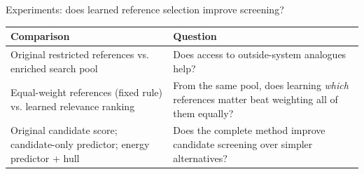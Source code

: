 \documentclass[10pt,aspectratio=169]{beamer}
\begin{document}
\begin{frame}{Experiments: does learned reference selection improve screening?}
\small
\begin{tabular}{>{\raggedright\arraybackslash}p{}>{\raggedright\arraybackslash}p{}}
\toprule
Comparison & Question \\\midrule
Original restricted references vs. enriched search pool & Does access to outside-system analogues help? \\[4mm]
Equal-weight references (fixed rule) vs. learned relevance ranking & From the same pool, does learning \emph{which} references matter beat weighting all of them equally? \\[4mm]
Original candidate score; candidate-only predictor; energy predictor + hull & Does the complete method improve candidate screening over simpler alternatives? \\\bottomrule
\end{tabular}
\end{frame}
\end{document}
